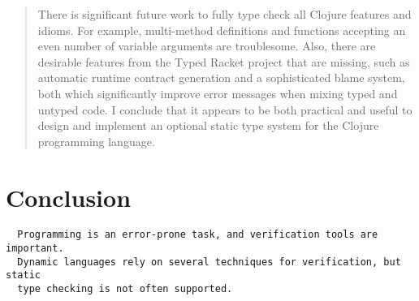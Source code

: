 \documentclass{cshonours}
\begin{document}
\begin{abstract}
There is significant future work to fully type check all Clojure features and idioms.
For example, multi-method definitions and functions accepting an even number of variable arguments
are troublesome. 
Also, there are desirable features from the Typed Racket project that are missing, such
as automatic runtime contract generation and a sophisticated blame system, 
both which significantly improve error messages when mixing typed and untyped code.
I conclude that it appears to be both practical and useful to design and implement an optional static type system for the
Clojure programming language.

\end{abstract}

\tableofcontents














%
%

%


\chapter{Conclusion}

\begin{verbatim}
  Programming is an error-prone task, and verification tools are important.
  Dynamic languages rely on several techniques for verification, but static
  type checking is not often supported.
\end{verbatim}

\printbibliography[title=References]
\end{document}
